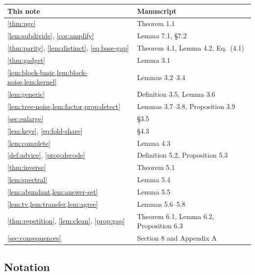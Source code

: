 \documentclass[11pt]{article}
\theoremstyle{definition}
\theoremstyle{remark}
\begin{document}
\begin{center}\small
\renewcommand{\arraystretch}{1.15}
\begin{tabular}{@{}ll@{}}
\toprule
\textbf{This note} & \textbf{Manuscript} \\
\midrule
\cref{thm:ugc} & Theorem 1.1 \\
\cref{lem:subdivide}, \cref{cor:amplify} & Lemma 7.1, \S7.2 \\
\cref{thm:parity}, \cref{lem:distinct}, \eqref{eq:base-gap} & Theorem 4.1, Lemma 4.2, Eq.~(4.1) \\
\cref{thm:gadget} & Lemma 3.1 \\
\cref{lem:block-basic,lem:block-noise,lem:kernel} & Lemmas 3.2--3.4 \\
\cref{lem:generic} & Definition 3.5, Lemma 3.6 \\
\cref{lem:tree-noise,lem:factor,prop:detect} & Lemmas 3.7--3.8, Proposition 3.9 \\
\cref{sec:enlarge} & \S3.5 \\
\cref{lem:keys}, \eqref{eq:fold-share} & \S4.3 \\
\cref{lem:complete} & Lemma 4.3 \\
\cref{def:advice}, \cref{prop:decode} & Definition 5.2, Proposition 5.3 \\
\cref{thm:inverse} & Theorem 5.1 \\
\cref{lem:spectral} & Lemma 5.4 \\
\cref{lem:abundant,lem:answer-set} & Lemma 5.5 \\
\cref{lem:tv,lem:transfer,lem:agree} & Lemmas 5.6--5.8 \\
\cref{thm:repetition}, \cref{lem:clean}, \cref{prop:gap} & Theorem 6.1, Lemma 6.2, Proposition 6.3 \\
\cref{sec:consequences} & Section 8 and Appendix A \\
\bottomrule
\end{tabular}
\end{center}

\subsection{Notation}
\end{document}
